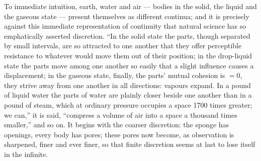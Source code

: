 \documentclass[12pt,a4paper]{book}
\begin{document}
To immediate intuition, earth, water and air --- bodies in the solid, the
liquid and the gaseous state --- present themselves as different continua; and
it is precisely against this immediate representation of continuity that
natural science has so emphatically asserted discretion. ``In the solid state
the parts, though separated by small intervals, are so attracted to one another
that they offer perceptible resistance to whatever would move them out of their
position; in the drop-liquid state the parts move among one another so easily
that a slight influence causes a displacement; in the gaseous state, finally,
the parts' mutual cohesion is $= 0$, they strive away from one another in all
directions: vapours expand. In a pound of liquid water the parts of water are
plainly closer beside one another than in a pound of steam, which at ordinary
pressure occupies a space 1700 times greater; we can,'' it is said, ``compress
a volume of air into a space a thousand times smaller,'' and so on. It begins
with the coarser discretion: the sponge has openings, every body has pores;
these pores now become, as observation is sharpened, finer and ever finer, so
that finite discretion seems at last to lose itself in the infinite.
\end{document}
